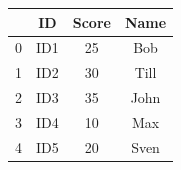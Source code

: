 \documentclass{article}
\begin{document}
\begin{table}[h]
\centering
\begin{tabular}{c c c c}
\toprule
 & ID & Score & Name \\
\midrule
0 & ID1 & 25 & Bob \\
1 & ID2 & 30 & Till \\
2 & ID3 & 35 & John \\
3 & ID4 & 10 & Max \\
4 & ID5 & 20 & Sven \\
\bottomrule
\end{tabular}
\end{table}
\end{document}
